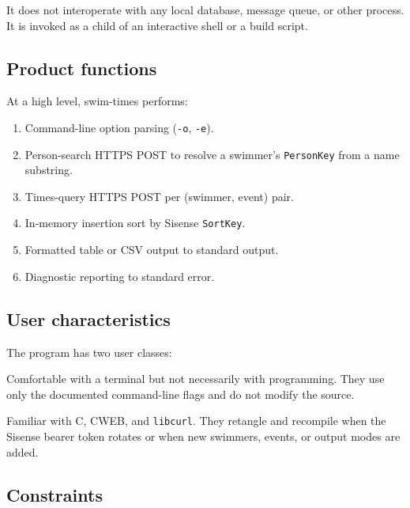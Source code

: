 \documentclass[12pt]{article}
\newcommand{\code}[1]{\texttt{#1}}
\begin{document}
It does not interoperate with any local database, message queue,
or other process.  It is invoked as a child of an interactive
shell or a build script.

\subsection{Product functions}

At a high level, swim-times performs:

\begin{enumerate}
  \item Command-line option parsing (\code{-o}, \code{-e}).
  \item Person-search HTTPS POST to resolve a swimmer's
        \code{PersonKey} from a name substring.
  \item Times-query HTTPS POST per (swimmer, event) pair.
  \item In-memory insertion sort by Sisense \code{SortKey}.
  \item Formatted table or CSV output to standard output.
  \item Diagnostic reporting to standard error.
\end{enumerate}

\subsection{User characteristics}

The program has two user classes:

\begin{description}[style=nextline]
  \item[Coaches and parents.]
        Comfortable with a terminal but not necessarily with
        programming.  They use only the documented command-line
        flags and do not modify the source.
  \item[Maintainers.]
        Familiar with C, CWEB, and \code{libcurl}.  They retangle
        and recompile when the Sisense bearer token rotates or
        when new swimmers, events, or output modes are added.
\end{description}

\subsection{Constraints}
\end{document}
